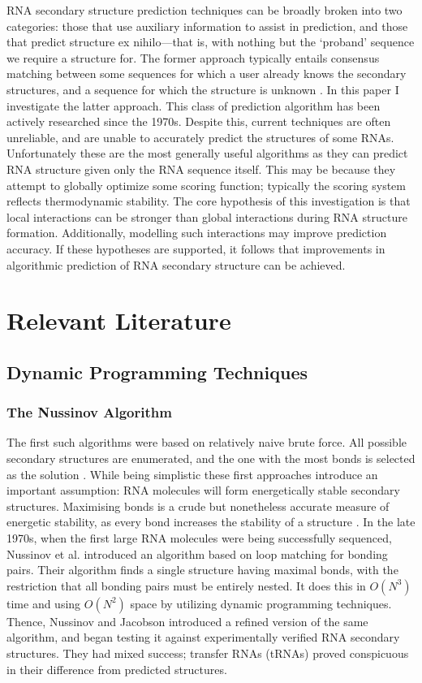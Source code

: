 \documentclass{cshonours}
\begin{document}
RNA secondary structure prediction techniques can be broadly broken into two categories: those that use auxiliary information to assist in prediction, and those that predict structure ex nihilo---that is, with nothing but the `proband' sequence we require a structure for. The former approach typically entails consensus matching between some sequences for which a user already knows the secondary structures, and a sequence for which the structure is unknown \cite{hofacker2008rna}. In this paper I investigate the latter approach. This class of prediction algorithm has been actively researched since the 1970s. Despite this, current techniques are often unreliable, and are unable to accurately predict the structures of some RNAs. Unfortunately these are the most generally useful algorithms as they can predict RNA structure given only the RNA sequence itself. This may be because they attempt to globally optimize some scoring function; typically the scoring system reflects thermodynamic stability. The core hypothesis of this investigation is that local interactions can be stronger than global interactions during RNA structure formation. Additionally, modelling such interactions may improve prediction accuracy. If these hypotheses are supported, it follows that improvements in algorithmic prediction of RNA secondary structure can be achieved.


\chapter{Relevant Literature}
\section{Dynamic Programming Techniques}
\subsection{The Nussinov Algorithm}
The first such algorithms were based on relatively naive brute force. All possible secondary structures are enumerated, and the one with
the most bonds is selected as the solution \cite{nussinov1978algorithms}. While being simplistic
these first approaches introduce an important assumption: RNA molecules will
form energetically stable secondary structures. Maximising bonds is a crude but
nonetheless accurate measure of energetic stability, as every bond increases the
stability of a structure \cite{nussinov1978algorithms}. In the late 1970s, when the first large RNA molecules
were being successfully sequenced, Nussinov et al. \cite{nussinov1978algorithms} introduced an algorithm
based on loop matching for bonding pairs. Their algorithm finds a
single structure having maximal bonds, with the restriction that all bonding pairs must be entirely nested. It does this in $O(N^3)$ time and using $O(N^2)$ space by utilizing dynamic programming techniques. Thence, Nussinov and Jacobson \cite{nussinov1980fast} introduced
a refined version of the same algorithm, and began testing it against experimentally verified RNA secondary structures. They had mixed success; transfer RNAs
(tRNAs) proved conspicuous in their difference from predicted structures.
\end{document}
